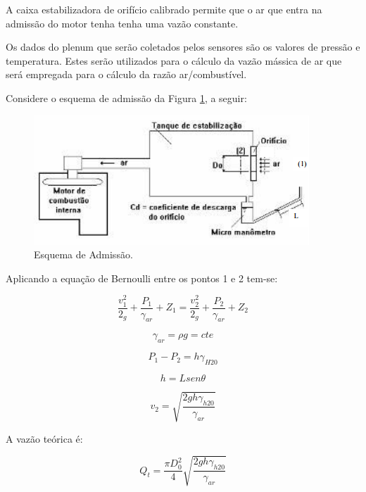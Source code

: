 A caixa estabilizadora de orifício calibrado permite que o ar que entra na admissão do motor tenha tenha uma vazão constante.

Os dados do plenum que serão coletados pelos sensores são os valores de pressão e temperatura. Estes serão utilizados para o cálculo da vazão mássica de ar que será empregada para o cálculo da razão ar/combustível.

Considere o esquema de admissão da Figura \ref{esquema-de-admissao}, a seguir:

\begin{figure}[h!]
	\centering
	\includegraphics[keepaspectratio=true,scale= 0.8]{figuras/esquema-de-admissao.png}
	\caption{Esquema de Admissão.}
	\label{esquema-de-admissao}
\end{figure}

Aplicando a equação de Bernoulli entre os pontos 1 e 2 tem-se:

\begin{equation}
	\frac{v_{1}^{2}}{2_{g}} + \frac{P_{1}}{\gamma _{ar}} + Z_{1} = \frac{v_{2}^{2}}{2_{g}} + \frac{P_{2}}{\gamma _{ar}} + Z_{2}
\end{equation}

\begin{equation}
	\gamma _{ar} = \rho g = cte
\end{equation}

\begin{equation}
	P_{1} - P_{2} = h\gamma _{H20}
\end{equation}

\begin{equation}
	h = Lsen\theta
\end{equation}

\begin{equation}
	v_{2} = \sqrt{\frac{2gh\gamma _{h20}}{\gamma _{ar}}}
\end{equation}

A vazão teórica é:

\begin{equation}
	Q_{t} = \frac{\pi D_{0}^{2}}{4}\sqrt{\frac{2gh\gamma _{h20}}{\gamma _{ar}}}
\end{equation}

